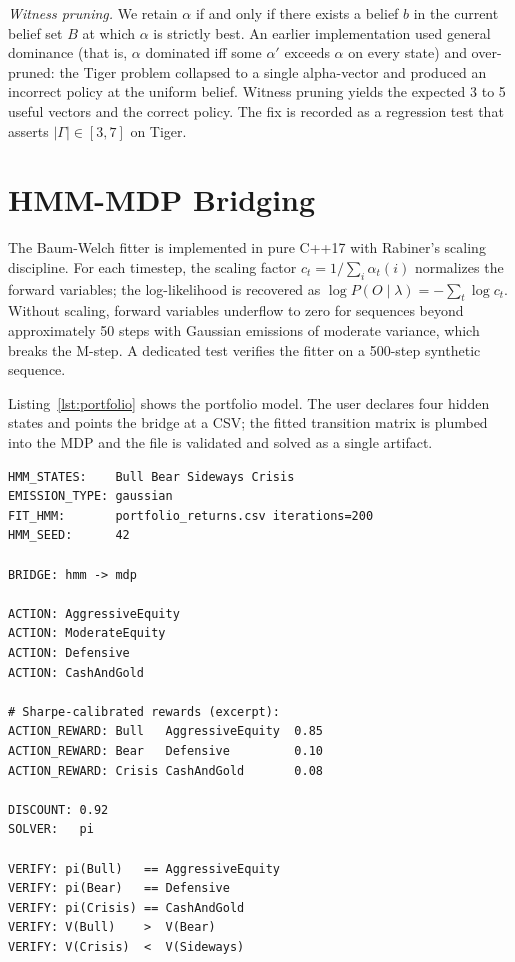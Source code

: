 \documentclass[conference]{IEEEtran}
\begin{document}
\emph{Witness pruning.} We retain $\alpha$ if and only if there
exists a belief $b$ in the current belief set $B$ at which $\alpha$
is strictly best. An earlier implementation used general dominance
(that is, $\alpha$ dominated iff some $\alpha'$ exceeds $\alpha$ on
every state) and over-pruned: the Tiger problem collapsed to a single
alpha-vector and produced an incorrect policy at the uniform belief.
Witness pruning yields the expected 3 to 5 useful vectors and the
correct policy. The fix is recorded as a regression test that asserts
$|\Gamma| \in [3, 7]$ on Tiger.

\section{HMM-MDP Bridging}\label{sec:hmm}

The Baum-Welch fitter is implemented in pure C++17 with Rabiner's
scaling discipline. For each timestep, the scaling factor
$c_t = 1 / \sum_i \alpha_t(i)$ normalizes the forward variables; the
log-likelihood is recovered as
$\log P(O \mid \lambda) = -\sum_t \log c_t$. Without scaling,
forward variables underflow to zero for sequences beyond
approximately 50 steps with Gaussian emissions of moderate variance,
which breaks the M-step. A dedicated test verifies the fitter on a
500-step synthetic sequence.

Listing~\ref{lst:portfolio} shows the portfolio model. The user
declares four hidden states and points the bridge at a CSV; the
fitted transition matrix is plumbed into the MDP and the file is
validated and solved as a single artifact.

\begin{lstlisting}[style=dsl,caption={HMM-bridged portfolio optimizer (excerpt).},label={lst:portfolio}]
HMM_STATES:    Bull Bear Sideways Crisis
EMISSION_TYPE: gaussian
FIT_HMM:       portfolio_returns.csv iterations=200
HMM_SEED:      42

BRIDGE: hmm -> mdp

ACTION: AggressiveEquity
ACTION: ModerateEquity
ACTION: Defensive
ACTION: CashAndGold

# Sharpe-calibrated rewards (excerpt):
ACTION_REWARD: Bull   AggressiveEquity  0.85
ACTION_REWARD: Bear   Defensive         0.10
ACTION_REWARD: Crisis CashAndGold       0.08

DISCOUNT: 0.92
SOLVER:   pi

VERIFY: pi(Bull)   == AggressiveEquity
VERIFY: pi(Bear)   == Defensive
VERIFY: pi(Crisis) == CashAndGold
VERIFY: V(Bull)    >  V(Bear)
VERIFY: V(Crisis)  <  V(Sideways)
\end{lstlisting}
\end{document}
